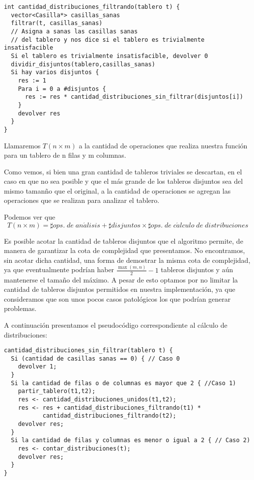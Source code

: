 \documentclass[a4paper, 12pt] {article}
\begin{document}
\begin{verbatim}
int cantidad_distribuciones_filtrando(tablero t) {
  vector<Casilla*> casillas_sanas
  filtrar(t, casillas_sanas)  
  // Asigna a sanas las casillas sanas 
  // del tablero y nos dice si el tablero es trivialmente insatisfacible
  Si el tablero es trivialmente insatisfacible, devolver 0
  dividir_disjuntos(tablero,casillas_sanas)
  Si hay varios disjuntos {
    res := 1
    Para i = 0 a #disjuntos {
      res := res * cantidad_distribuciones_sin_filtrar(disjuntos[i])
    }
    devolver res
  }
}
\end{verbatim}


Llamaremos $T\left( n \times m\right) $ a la cantidad de operaciones que realiza nuestra funci\'on para un tablero de n filas y m columnas.


Como vemos, si bien una gran cantidad de tableros triviales se descartan, en el caso en que no sea posible y que el m\'as grande de los tableros disjuntos sea del mismo taman\~no que el original, a la cantidad de operaciones se agregan las operaciones que se realizan para analizar el tablero.


Podemos ver que \begin{equation} \label{eq:op_total}
T\left( n \times m\right) = \sharp ops.\; de\; an\acute{a}lisis + \sharp disjuntos \times \sharp ops. \;de\; c\acute{a}lculo\; de\; distribuciones 
\end{equation}

Es posible acotar la cantidad de tableros disjuntos que el algoritmo permite, de manera de garantizar la cota de complejidad que presentamos. No encontramos, sin acotar dicha cantidad, una forma de demostrar la misma cota de complejidad, ya que eventualmente podr\'ian haber $\frac{\max\left( m,n\right) }{2} - 1$ tableros disjuntos y a\'un mantenerse el tama\~no del m\'aximo. A pesar de esto optamos por no limitar la cantidad de tableros disjuntos permitidos en nuestra implementaci\'on, ya que consideramos que son unos pocos casos patol\'ogicos los que podr\'ian generar problemas.


A continuaci\'on presentamos el pseudoc\'odigo correspondiente al c\'alculo de distribuciones:

\begin{verbatim}
cantidad_distribuciones_sin_filtrar(tablero t) {
  Si (cantidad de casillas sanas == 0) { // Caso 0
    devolver 1;
  }
  Si la cantidad de filas o de columnas es mayor que 2 { //Caso 1)
    partir_tablero(t1,t2);
    res <- cantidad_distribuciones_unidos(t1,t2);
    res <- res + cantidad_distribuciones_filtrando(t1) * 
           cantidad_distribuciones_filtrando(t2);
    devolver res;
  }
  Si la cantidad de filas y columnas es menor o igual a 2 { // Caso 2)
    res <- contar_distribuciones(t);
    devolver res;
  }
}
\end{verbatim}
\end{document}
